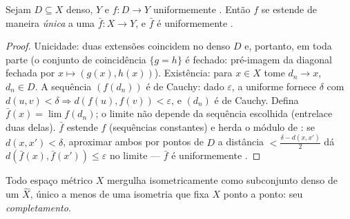 \begin{theorem}
\label{thm:b3:complete:extension}
Sejam $D \subseteq X$ denso, $Y$  e $f \colon D \to
Y$ uniformemente . Então
$f$ se estende de maneira \emph{única} a uma 
$\bar f \colon X \to Y$, e $\bar f$ é uniformemente .
\end{theorem}

\begin{proof}
Unicidade: duas extensões  coincidem no denso $D$ e,
portanto, em toda parte (o conjunto de coincidência $\{g = h\}$ é fechado:
pré-imagem da diagonal fechada por $x\mapsto(g(x), h(x))$). Existência: para $x \in X$ tome
$d_n \to x$, $d_n \in D$. A sequência $(f(d_n))$ é de Cauchy: dado $\varepsilon$, a 
uniforme fornece $\delta$ com $d(u,v) < \delta \Rightarrow
d(f(u), f(v)) < \varepsilon$, e $(d_n)$ é de Cauchy. Defina
$\bar f(x) = \lim f(d_n)$; o limite não depende da sequência escolhida (entrelace duas
delas). $\bar f$ estende $f$ (sequências constantes) e herda o
módulo de : se $d(x, x') < \delta$, aproximar ambos por pontos de $D$ a
distância $< \frac{\delta - d(x,x')}2$ dá $d(\bar f(x), \bar
f(x')) \leq \varepsilon$ no limite --- $\bar f$ é uniformemente
.
\end{proof}

\begin{theorem}[Completamento]\label{thm:b3:complete:completion}
Todo espaço métrico $X$ mergulha isometricamente como subconjunto
denso de um  $\hat X$, único a menos de uma
isometria que fixa $X$ ponto a ponto: seu
\emph{completamento}.
\end{theorem}

